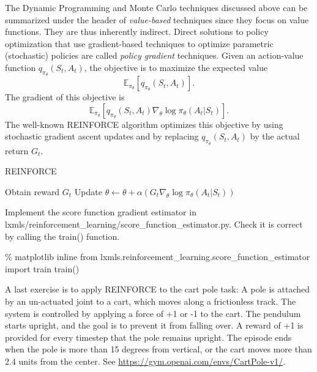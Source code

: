 The Dynamic Programming and Monte Carlo techniques discussed above can be summarized under the header of \emph{value-based} techniques since they focus on value functions. They are thus inherently indirect. Direct solutions to policy optimization that use gradient-based techniques to optimize parametric (stochastic) policies are called \emph{policy gradient} techniques. Given an action-value function $q_{\pi_\theta}(S_t,A_t)$, the objective is to maximize the expected value  \[\mathbb{E}_{\pi_{\theta}}[q_{\pi_\theta}(S_t,A_t)].\]
The gradient of this objective is  
\[\mathbb{E}_{\pi_{\theta}}[q_{\pi_\theta}(S_t,A_t) \nabla_{\theta} \log \pi_{\theta}(A_t|S_t)].\]
The well-known REINFORCE algorithm optimizes this objective by using stochastic gradient ascent updates and by replacing $q_{\pi_\theta}(S_t,A_t)$ by the actual return $G_t$.

\begin{algorithm}[t!]
\label{algo:reinforce}
   \caption{REINFORCE}
\begin{algorithmic}[1]
\STATE Obtain reward $G_t$%
\STATE Update $\theta \leftarrow \theta + \alpha (
G_t
\nabla_{\theta} \log \pi_{\theta}(A_t|S_t))$
\ENDFOR
	\ENDFOR
\end{algorithmic}
\end{algorithm}



\begin{exercise}
Implement the score function gradient estimator in lxmls/reinforcement\_learning/score\_function\_estimator.py. Check it is correct by calling the train() function.
\begin{python}
\% matplotlib inline
from lxmls.reinforcement_learning.score_function_estimator import train
train()
\end{python}
\end{exercise}

A last exercise is to apply REINFORCE to the cart pole task: A pole is attached by an un-actuated joint to a cart, which moves along a frictionless track. The system is controlled by applying a force of +1 or -1 to the cart. The pendulum starts upright, and the goal is to prevent it from falling over. A reward of +1 is provided for every timestep that the pole remains upright. The episode ends when the pole is more than 15 degrees from vertical, or the cart moves more than 2.4 units from the center. See \url{ https://gym.openai.com/envs/CartPole-v1/}.

